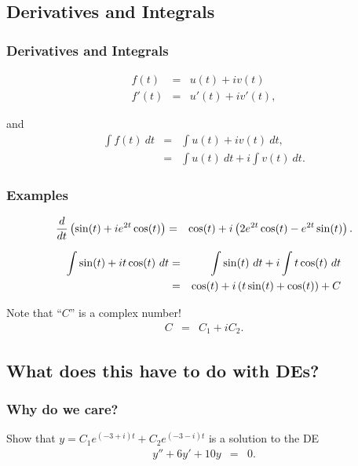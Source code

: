 \subsection{Derivatives and Integrals}

\begin{frame}
  \frametitle{Derivatives and Integrals}

  \begin{eqnarray*}
    f(t) & = & u(t) + i v(t) \\
    f'(t) & = & u'(t) + i v'(t),
  \end{eqnarray*}

  and
  \begin{eqnarray*}
    \int f(t) ~ dt & = & \int u(t) + i v(t) ~ dt, \\
    & = & \int u(t) ~ dt + i \int v(t) ~ dt.
  \end{eqnarray*}

\end{frame}


\begin{frame}
  \frametitle{Examples}

  \begin{eqnarray*}
    \frac{d}{dt} \left( \sin(t) + i e^{2t} \cos(t) \right) & = &
    \cos(t) + i \left( 2 e^{2t} \cos(t) - e^{2t} \sin(t) \right).
  \end{eqnarray*}

  \begin{eqnarray*}
    \int \sin(t) + i t \cos(t) ~ dt & = &
    \int \sin(t) ~ dt + i \int t \cos(t) ~ dt \\
    & = & \cos(t) + i \left( t\sin(t) + \cos(t) \right) + C
  \end{eqnarray*}

  Note that ``$C$'' is a complex number!
  \begin{eqnarray*}
    C & = & C_1 + i C_2.
  \end{eqnarray*}

\end{frame}

\subsection{What does this have to do with DEs?}

\begin{frame}
  \frametitle{Why do we care?}

  Show that $y=C_1 e^{(-3+i)t} + C_2 e^{(-3-i)t}$ is a solution to the DE
  \begin{eqnarray*}
    y'' + 6y' + 10y & = & 0.
  \end{eqnarray*}

\end{frame}




